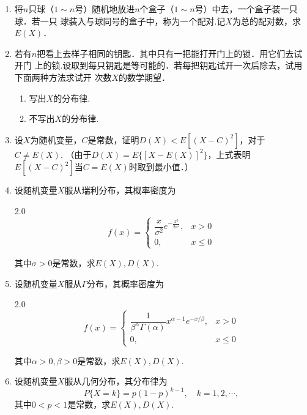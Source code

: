 \begin{enumerate}
    \item 将$n$只球（$1\sim n$号）随机地放进$n$个盒子（$1\sim n$号）中去，一个盒子装一只球．若一只
    球装入与球同号的盒子中，称为一个配对.记$X$为总的配对数，求$E(X)$．


    \item 若有$n$把看上去样子相同的钥匙．其中只有一把能打开门上的锁．用它们去试开门
    上的锁.设取到每只钥匙是等可能的．若每把钥匙试开一次后除去，试用下面两种方法求试开
    次数$X$的数学期望．
    \begin{enumerate}
        \item 写出$X$的分布律.
        \item 不写出$X$的分布律.
    \end{enumerate}
    


    \item 设$X$为随机变量，$C$是常数，证明$D(X)<E[(X-C)^2]$，对于$C\neq E(X)$.
    （由于$D(X)=E\{[X-E(X)]^2\}$，上式表明$E[(X-C)^2]$当$C=E(X)$时取到最小值．）


    \item 设随机变量$X$服从瑞利分布，其概率密度为
    \vspace{-0.5cm}
    \begin{spacing}{2.0}
    $$f(x)=\left\{\begin{array}{ll}
        \dfrac{x}{\sigma^2}e^{-\frac{x^{\scriptscriptstyle 2}}{2\sigma^{\scriptscriptstyle 2}}}, & x>0\\
        0, & x\leq 0
    \end{array}\right.$$
    \end{spacing}
    \vspace{-0.5cm}
    其中$\sigma>0$是常数，求$E(X),D(X)$.


    \item 设随机变量$X$服从$\Gamma$分布，其概率密度为
    \vspace{-0.5cm}
    \begin{spacing}{2.0}
    $$f(x)=\left\{\begin{array}{ll}
        \dfrac{1}{\beta^\alpha \Gamma(\alpha)}x^{\alpha-1}e^{-x/\beta}, & x>0\\
        0, & x\leq 0
    \end{array}\right.$$
    \end{spacing}
    \vspace{-0.5cm}
    其中$\alpha>0,\beta>0$是常数，求$E(X),D(X)$.



    \item 设随机变量$X$服从几何分布，其分布律为
    $$P\{X=k\}=p(1-p)^{k-1},\quad k=1,2,\cdots,$$
    其中$0<p<1$是常数，求$E(X),D(X)$.




\end{enumerate}
